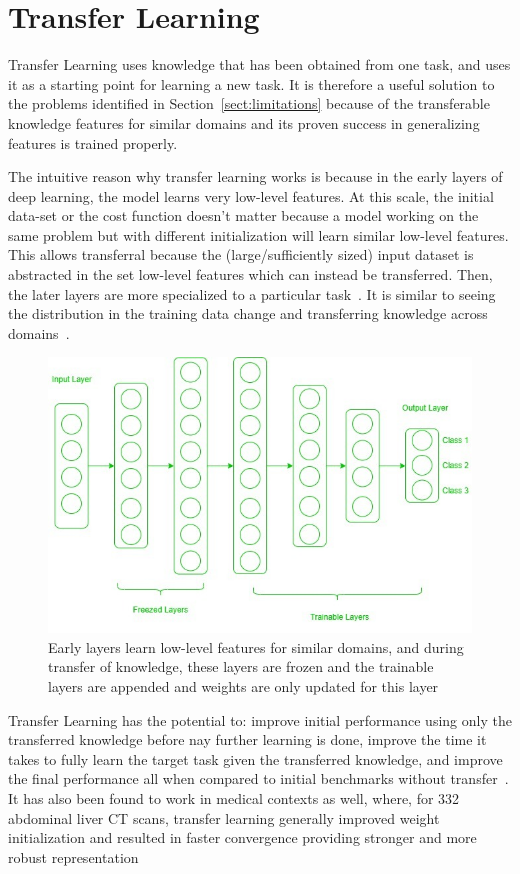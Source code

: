 \documentclass[11pt,twoside]{report}
\begin{document}
\section{Transfer Learning}\label{sect:transfer-learning}

Transfer Learning uses knowledge that has been obtained from one task, and uses it as a starting point for learning a new task. It is therefore a useful solution to the problems identified in Section~\ref{sect:limitations} because of the transferable knowledge features for similar domains  and its proven success in generalizing features is trained properly.

The intuitive reason why transfer learning works is because in the early layers of deep learning, the model learns very low-level features. At this scale, the initial data-set or the cost function doesn't matter because a model working on the same problem but with different initialization will learn similar low-level features. This allows transferral because the (large/sufficiently sized) input dataset is abstracted in the set low-level features which can instead be transferred. Then, the later layers are more specialized to a particular task~\cite{deep-learning-book}. It is similar to seeing the distribution in the training data change and transferring knowledge across domains~\cite{survey-on-transfer-learning}.

\begin{figure}
  \centering
  \includegraphics[width=0.7\linewidth]{../figures/Frozen-layers.jpg}
  \caption{Early layers learn low-level features for similar domains, and during transfer of knowledge, these layers are frozen and the trainable layers are appended and weights are only updated for this layer~\cite{geeks-transfer-learning}}
 \label{fig:frozen-layers}
\end{figure}

Transfer Learning has the potential to: improve initial performance using only the transferred knowledge before nay further learning is done, improve the time it takes to fully learn the target task given the transferred knowledge, and improve the final performance all when compared to initial benchmarks without transfer~\cite{torrey-handbook}. It has also been found to work in medical contexts as well, where, for 332 abdominal liver CT scans, transfer learning generally improved weight initialization and resulted in faster convergence providing stronger and more robust representation~\cite{liver-lesion-via-transfer-learning}
\end{document}
